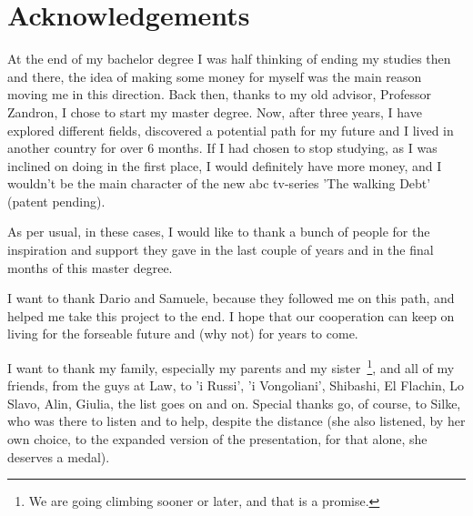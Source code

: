 \chapter*{Acknowledgements}
At the end of my bachelor degree I was half thinking of ending my studies then and there, the idea
of making some money for myself was the main reason moving me in this direction. Back then, thanks
to my old advisor, Professor Zandron, I chose to start my master degree. Now, after three years, I
have explored different fields, discovered a potential path for my future and I lived in another
country for over $6$ months. If I had chosen to stop studying, as I was inclined on doing in the
first place, I would definitely have more money, and I wouldn't be the main character of the new abc
tv-series 'The walking Debt' (patent pending).

\medskip

As per usual, in these cases, I would like to thank a bunch of people for the inspiration and support
they gave in the last couple of years and in the final months of this master degree.

\smallskip

I want to thank Dario and Samuele, because they followed me on this path, and helped me take this
project to the end. I hope that our cooperation can keep on living for the forseable future and (why
not) for years to come.

\smallskip

I want to thank my family, especially my parents and my sister~\footnote{
	We are going climbing sooner or later, and that is a promise.
}, and all of my friends, from the guys at Law, to 'i Russi', 'i Vongoliani', Shibashi, El
Flachin, Lo Slavo, Alin, Giulia, the list goes on and on. Special thanks go, of course, to Silke, who was
there to listen and to help, despite the distance (she also listened, by her own choice, to the
expanded version of the presentation, for that alone, she deserves a medal).

\smallskip


